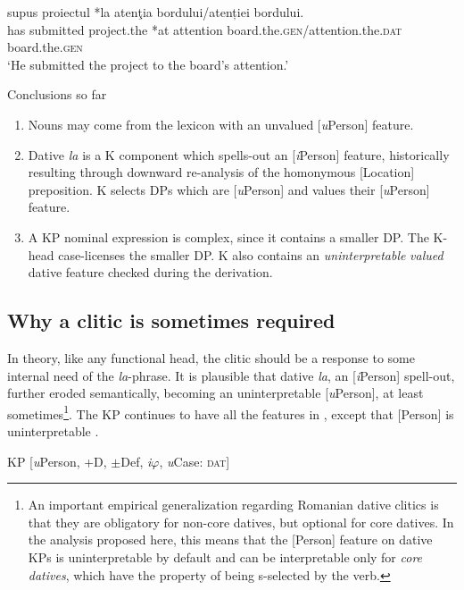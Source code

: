 \documentclass[output=paper,colorlinks,citecolor=brown,nonflat]{./langscibook}
\begin{document}
\ea%
      \label{ex:cornilescu:16}
       {supus} {proiectul} *{la} {atenţia} bordului/{atenției} {bordului}. \\
            has submitted project.the *at attention board.the.\textsc{gen}/attention.the.\textsc{dat} board.the.\textsc{gen}\\
      \glt  ‘He submitted the project to the board’s attention.’
   \z

 {Conclusions} {so} {far}
 \begin{enumerate}
	\item Nouns may come from the lexicon with an unvalued [\textit{u}Person] feature. 
	\item Dative \textit{la} is a K component which spells-out an [\textit{i}Person] feature, historically resulting through downward re-analysis of the homonymous [Location] preposition. K selects DPs which are [\textit{u}Person] and values their [\textit{u}Person] feature.
	\item A KP nominal expression is complex, since it contains a smaller DP. The K-head case-licenses the smaller DP. K also contains an \textit{uninterpretable} \textit{valued} dative feature checked during the derivation.
	\end{enumerate}

\subsection{Why a clitic is sometimes required}

In theory, like any functional head, the clitic should be a response to some internal need of the \textit{la}-phrase. It is plausible that dative \textit{la}, an [\textit{i}Person] spell-out, further eroded semantically, becoming an uninterpretable [\textit{u}Person], at least sometimes\footnote{An important empirical generalization \citep{Cornilescu2017} regarding Romanian dative clitics is that they are obligatory for non-core datives, but optional for core datives. In the analysis proposed here, this means that the [Person] feature on dative KPs is uninterpretable by default and can be interpretable only for \textit{core} \textit{datives}, which have the property of being s-selected by the verb.}. The KP continues to have all the features in , except that [Person] is uninterpretable .

\ea%
      \label{ex:cornilescu:17}
      KP [\textit{u}Person, +D, ${\pm}$Def, \textit{i}${\varphi}$, \textit{u}Case: \textsc{dat}]
      \z
\end{document}
